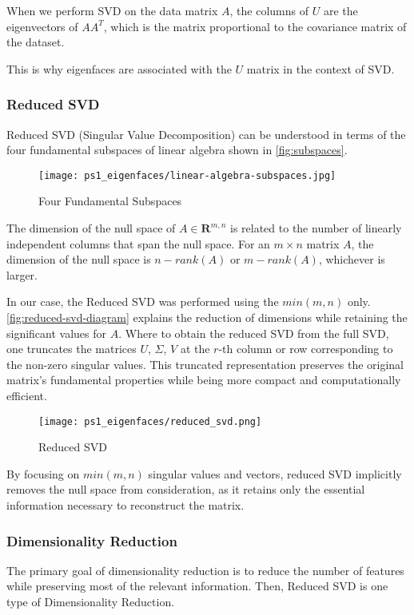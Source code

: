 \documentclass{article} %
\theoremstyle{definition}
\theoremstyle{remark}
\theoremstyle{plain}
\begin{document}
        When we perform SVD on the data matrix \(A\), the columns of \(U\) are the eigenvectors of \(AA^T\), which is the matrix proportional to the covariance matrix of the dataset.

        This is why eigenfaces are associated with the \(U\) matrix in the context of SVD.
        
    \subsubsection{Reduced SVD}
        Reduced SVD (Singular Value Decomposition) can be understood in terms of the four fundamental subspaces of linear algebra shown in \autoref{fig:subspaces}.
        \begin{figure}[h!]
            \centering
            \texttt{[image: ps1\_eigenfaces/linear-algebra-subspaces.jpg]}
            \caption{Four Fundamental Subspaces}
            \label{fig:subspaces}
        \end{figure}

        The dimension of the null space of \(A \in \mathbf{R}^{m,n}\) is related to the number of linearly independent columns that span the null space. For an \(m \times n\) matrix \(A\), the dimension of the null space is \(n - rank(A)\) or \(m-rank(A)\), whichever is larger.
        
        In our case, the Reduced SVD was performed using the \(min(m,n)\) only. \autoref{fig:reduced-svd-diagram} explains the reduction of dimensions while retaining the significant values for \(A\). Where to obtain the reduced SVD from the full SVD, one truncates the matrices $U$, $\Sigma$, $V$ at the $r$-th column or row corresponding to the non-zero singular values. This truncated representation preserves the original matrix's fundamental properties while being more compact and computationally efficient.
        
        \begin{figure}[h!]
            \centering
            \texttt{[image: ps1\_eigenfaces/reduced\_svd.png]}
            \caption{Reduced SVD}
            \label{fig:reduced-svd-diagram}
        \end{figure}

        By focusing on \(min(m,n)\) singular values and vectors, reduced SVD implicitly removes the null space from consideration, as it retains only the essential information necessary to reconstruct the matrix.

    \subsubsection{Dimensionality Reduction}
        The primary goal of dimensionality reduction is to reduce the number of features while preserving most of the relevant information. Then, Reduced SVD is one type of Dimensionality Reduction. 
        
\end{document}
